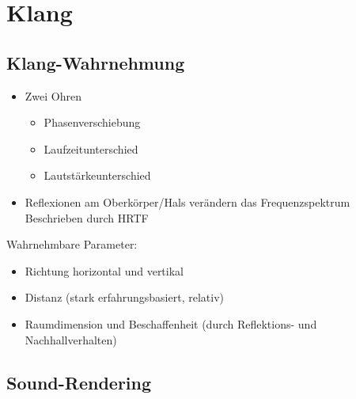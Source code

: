 \documentclass[a4paper, 12pt]{article}
\begin{document}
\section{Klang}


\subsection[Wahrnehmung]{Klang-Wahrnehmung}
\begin{itemize}
  \item Zwei Ohren
    \begin{itemize}
      \renewcommand{\labelitemii}{\(\Rightarrow\)}%
      \item Phasenverschiebung
      \item Laufzeitunterschied
      \item Lautstärkeunterschied
    \end{itemize}
  \item Reflexionen am Oberkörper/Hals verändern das Frequenzspektrum\\
    Beschrieben durch HRTF
\end{itemize}
Wahrnehmbare Parameter:
\begin{itemize}
  \item Richtung horizontal und vertikal
  \item Distanz (stark erfahrungsbasiert, relativ)
  \item Raumdimension und Beschaffenheit (durch Reflektions- und Nachhallverhalten)
\end{itemize}


\subsection[Rendering]{Sound-Rendering}
\end{document}
